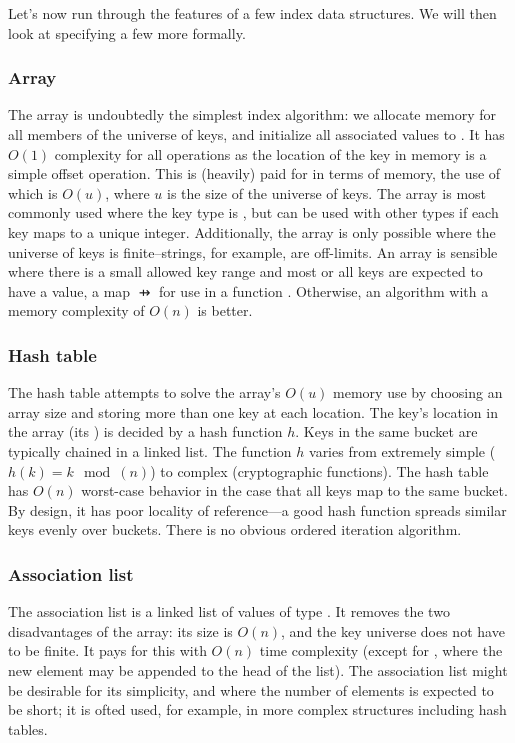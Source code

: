 Let's now run through the features of a few index data structures.
We will then look at specifying a few more formally.


\subsubsection{Array}

The array is undoubtedly the simplest index algorithm:
  we allocate memory for all members of the universe of keys,
  and initialize all associated values to .
It has $O(1)$ complexity for all operations
  as the location of the key in memory is a simple offset operation.
This is (heavily) paid for in terms of memory,
  the use of which is $O(u)$, where $u$ is the size of the universe of keys.
The array is most commonly used where the key type is ,
  but can be used with other types if each key maps to a unique integer.
Additionally, the array is only possible where the universe of keys is finite--strings,
  for example, are off-limits.
An array is sensible where
  there is a small allowed key range
  and most or all keys are expected to have a value,
  \eg a map $\pfun$ for use in a function .
Otherwise, an algorithm with a memory complexity of $O(n)$ is better.


\subsubsection{Hash table}

The hash table attempts to solve the array's $O(u)$ memory use
  by choosing an array size
  and storing more than one key at each location.
The key's location in the array (its )
  is decided by a hash function $h$.
Keys in the same bucket are typically chained in a linked list.
The function $h$ varies from extremely simple
  (\eg $h(k) = k \mod(n)$)
  to complex (\eg cryptographic functions).
The hash table has $O(n)$ worst-case behavior
  in the case that all keys map to the same bucket.
By design, it has poor locality of reference---a good hash function
  spreads similar keys evenly over buckets.
There is no obvious ordered iteration algorithm.


\subsubsection{Association list}

The association list is a linked list of values of type .
It removes the two disadvantages of the array:
  its size is $O(n)$,
  and the key universe does not have to be finite.
It pays for this with $O(n)$ time complexity
  (except for , where the new element may be appended to the head of the list).
The association list might be desirable for its simplicity,
  and where the number of elements is expected to be short;
  it is ofted used, for example, in more complex structures including hash tables.


